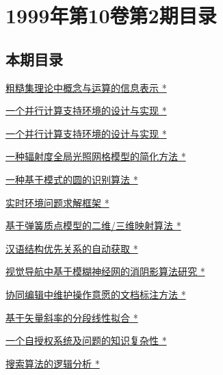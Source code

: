 \documentclass[a4paper]{article}
\begin{document}
\section{\textbf{1999年第10卷第2期目录}}
\subsection{本期目录}
\href{http://www.jos.org.cn/ch/reader/download_pdf.aspx?file_no=19990201&year_id=1999&quarter_id=2&falg=1}{粗糙集理论中概念与运算的信息表示 *}

\href{http://www.jos.org.cn/ch/reader/download_pdf.aspx?file_no=19990202&year_id=1999&quarter_id=2&falg=1}{一个并行计算支持环境的设计与实现 *}

\href{http://www.jos.org.cn/ch/reader/download_pdf.aspx?file_no=19990102&year_id=1999&quarter_id=2&falg=1}{一个并行计算支持环境的设计与实现 *}

\href{http://www.jos.org.cn/ch/reader/download_pdf.aspx?file_no=19990203&year_id=1999&quarter_id=2&falg=1}{一种辐射度全局光照网格模型的简化方法 *}

\href{http://www.jos.org.cn/ch/reader/download_pdf.aspx?file_no=19990204&year_id=1999&quarter_id=2&falg=1}{一种基于模式的圆的识别算法 *}

\href{http://www.jos.org.cn/ch/reader/download_pdf.aspx?file_no=19990205&year_id=1999&quarter_id=2&falg=1}{实时环境问题求解框架 *}

\href{http://www.jos.org.cn/ch/reader/download_pdf.aspx?file_no=19990206&year_id=1999&quarter_id=2&falg=1}{基于弹簧质点模型的二维/三维映射算法 *}

\href{http://www.jos.org.cn/ch/reader/download_pdf.aspx?file_no=19990207&year_id=1999&quarter_id=2&falg=1}{汉语结构优先关系的自动获取 *}

\href{http://www.jos.org.cn/ch/reader/download_pdf.aspx?file_no=19990208&year_id=1999&quarter_id=2&falg=1}{视觉导航中基于模糊神经网的消阴影算法研究 *}

\href{http://www.jos.org.cn/ch/reader/download_pdf.aspx?file_no=19990209&year_id=1999&quarter_id=2&falg=1}{协同编辑中维护操作意愿的文档标注方法 *}

\href{http://www.jos.org.cn/ch/reader/download_pdf.aspx?file_no=19990210&year_id=1999&quarter_id=2&falg=1}{基于矢量斜率的分段线性拟合 *}

\href{http://www.jos.org.cn/ch/reader/download_pdf.aspx?file_no=19990211&year_id=1999&quarter_id=2&falg=1}{一个自授权系统及问题的知识复杂性 *}

\href{http://www.jos.org.cn/ch/reader/download_pdf.aspx?file_no=19990212&year_id=1999&quarter_id=2&falg=1}{搜索算法的逻辑分析 *}
\end{document}
